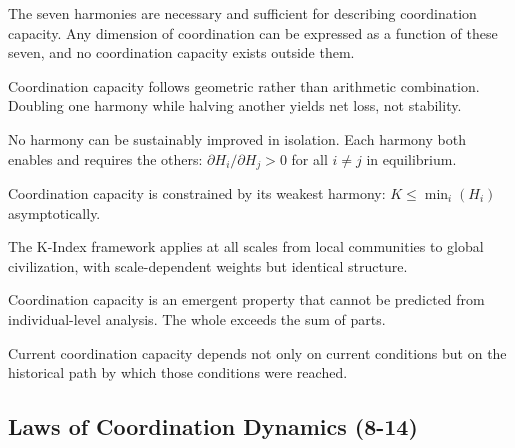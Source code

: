 \documentclass[12pt,letterpaper]{article}
\begin{document}
\begin{lawbox}
The seven harmonies are necessary and sufficient for describing coordination capacity. Any dimension of coordination can be expressed as a function of these seven, and no coordination capacity exists outside them.
\end{lawbox}

\begin{lawbox}
Coordination capacity follows geometric rather than arithmetic combination. Doubling one harmony while halving another yields net loss, not stability.
\end{lawbox}

\begin{lawbox}
No harmony can be sustainably improved in isolation. Each harmony both enables and requires the others: $\partial H_i / \partial H_j > 0$ for all $i \neq j$ in equilibrium.
\end{lawbox}

\begin{lawbox}
Coordination capacity is constrained by its weakest harmony: $K \leq \min_i(H_i)$ asymptotically.
\end{lawbox}

\begin{lawbox}
The K-Index framework applies at all scales from local communities to global civilization, with scale-dependent weights but identical structure.
\end{lawbox}

\begin{lawbox}
Coordination capacity is an emergent property that cannot be predicted from individual-level analysis. The whole exceeds the sum of parts.
\end{lawbox}

\begin{lawbox}
Current coordination capacity depends not only on current conditions but on the historical path by which those conditions were reached.
\end{lawbox}

\subsection{Laws of Coordination Dynamics (8-14)}
\end{document}
